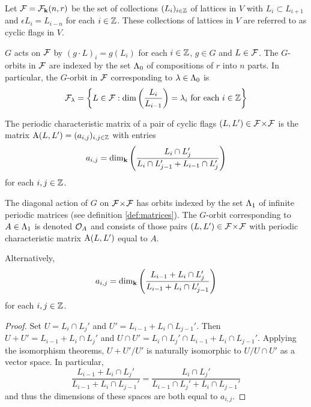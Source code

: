 \documentclass[a4paper, 11pt]{report}
\begin{document}
Let $\mathcal{F}=\mathcal{F}_{\mathbf{k}}(n,r)$ be the set of collections $(L_i)_{i\in\mathbb{Z}}$ of lattices in $V$ with $L_i\subset L_{i+1}$ and $\epsilon L_i = L_{i-n}$ for each $i\in\mathbb{Z}$. These collections of lattices in $V$ are referred to as cyclic flags in $V$. 

$G$ acts on $\mathcal{F}$ by $(g\cdot L)_i = g(L_i)$ for each $i\in\mathbb{Z}$, $g\in G$ and $L\in\mathcal{F}$. The $G$-orbits in $\mathcal{F}$ are indexed by the set $\Lambda_0{}$ of compositions of $r$ into $n$ parts. In particular, the $G$-orbit in $\mathcal{F}$ corresponding to $\lambda\in\Lambda_0{}$ is
\begin{equation*}
\mathcal{F}_\lambda = \left\{L\in\mathcal{F}: \dim\left(\frac{L_i}{L_{i-1}}\right) = \lambda_i \text{ for each } i\in\mathbb{Z}\right\}
\end{equation*}

\begin{definition}\label{def:characteristic-matrix}
The periodic characteristic matrix of a pair of cyclic flags $(L,L')\in{\mathcal{F}\!\times\!\mathcal{F}}$ is the matrix $\operatorname{A}(L,L')=(a_{i,j})_{i,j\in\mathbb{Z}}$ with entries
\begin{equation*}
a_{i,j} = \dim_{\mathbf{k}}\left(\frac{L_i\cap L_j'}{L_i\cap L_{j-1}' + L_{i-1}\cap L_j'}\right)
\end{equation*}
for each $i,j\in\mathbb{Z}$.
\end{definition}

The diagonal action of $G$ on ${\mathcal{F}\!\times\!\mathcal{F}}$ has orbits indexed by the set $\Lambda_1{}$ of infinite periodic matrices (see definition \ref{def:matrices}). The $G$-orbit corresponding to $A\in\Lambda_1{}$ is denoted $\mathcal{O}_{A}$ and consists of those pairs $(L,L')\in{\mathcal{F}\!\times\!\mathcal{F}}$ with periodic characteristic matrix $\operatorname{A}(L,L')$ equal to $A$.

\begin{lemma}
Alternatively,
\begin{equation*}
a_{i,j} = \dim_{\mathbf{k}}\left(\frac{L_{i-1} + L_i\cap L_j'}{L_{i-1} + L_i\cap L_{j-1}'}\right)
\end{equation*}
for each $i,j\in\mathbb{Z}$.
\end{lemma}
\begin{proof}
Set $U=L_i\cap L_j'$ and $U'=L_{i-1}+L_i\cap L_{j-1}'$. Then $U+U'=L_{i-1}+L_i\cap L_j'$ and $U\cap U'= L_i\cap L_j'\cap L_{i-1} + L_i\cap L_{j-1}'$. Applying the isomorphism theorems, ${U+U'}/{U'}$ is naturally isomorphic to $U/{U\cap U'}$ as a vector space. In particular,
\begin{equation*}
\frac{L_{i-1}+L_i\cap L_j'}{L_{i-1} + L_i\cap L_{j-1}'} = \frac{L_i\cap L_j'}{L_{i-1}\cap L_j' + L_i\cap L_{j-1}'}
\end{equation*}
and thus the dimensions of these spaces are both equal to $a_{i,j}$.
\end{proof}
\end{document}
